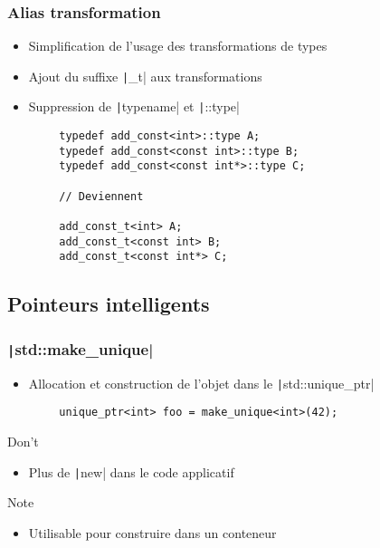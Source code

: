 \documentclass[C++.tex]{subfiles}
\begin{document}
\begin{frame}[fragile]
	\frametitle{Alias transformation}
	\begin{itemize}
		\item Simplification de l'usage des transformations de types
		\item Ajout du suffixe \texttt|_t| aux transformations
		\item Suppression de \texttt|typename| et \texttt|::type|
	\end{itemize}

	\begin{verbatim}
		typedef add_const<int>::type A;
		typedef add_const<const int>::type B;
		typedef add_const<const int*>::type C;

		// Deviennent

		add_const_t<int> A;
		add_const_t<const int> B;
		add_const_t<const int*> C;
	\end{verbatim}
\end{frame}

\subsection*{Pointeurs intelligents}
\begin{frame}[fragile]
	\frametitle{\texttt|std::make_unique|}
	\begin{itemize}
		\item Allocation et construction de l'objet dans le \texttt|std::unique_ptr|
	\end{itemize}

	\begin{verbatim}
		unique_ptr<int> foo = make_unique<int>(42);
	\end{verbatim}

	\begin{alertblock}{Don't}
		\begin{itemize}
			\item Plus de \texttt|new| dans le code applicatif
		\end{itemize}
	\end{alertblock}

	\begin{block}{Note}
		\begin{itemize}
			\item Utilisable pour construire dans un conteneur
		\end{itemize}
	\end{block}

\end{frame}
\end{document}
